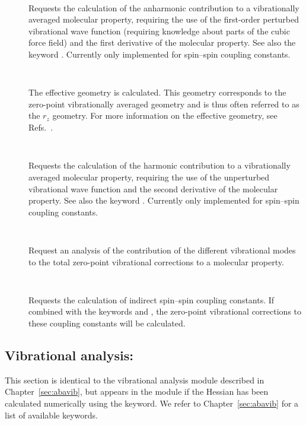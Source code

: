 \begin{description}

\item[]\verb| |\newline

Requests the calculation of the anharmonic contribution to a
vibrationally averaged molecular property, requiring the use of the
first-order perturbed vibrational wave function (requiring knowledge
about parts of the cubic force field) and the first derivative of the
molecular property. See also the keyword . Currently only
implemented for spin--spin coupling constants.

\item[]\verb| |\newline

The effective geometry is calculated. This geometry corresponds to the
zero-point vibrationally averaged geometry and is thus often referred
to as the $r_z$ geometry. For more information on the effective
geometry, see Refs.~\cite{poakrprtjcp112,krpoaprtjcp112}.

\item[]\verb| |\newline

Requests the calculation of the harmonic contribution to a
vibrationally averaged molecular property, requiring the use of the
unperturbed vibrational wave function and the second derivative of the
molecular property. See also the keyword . Currently only
implemented for spin--spin coupling constants.

\item[]\verb| |\newline

Request an analysis of the contribution of the different vibrational modes
to the total zero-point vibrational corrections to a molecular property.

\item[]\verb| |\newline

Requests the calculation of indirect spin--spin coupling constants.
If combined with the keywords  and , the
zero-point vibrational corrections to these coupling constants will be
calculated. 

\end{description}

\subsection{Vibrational analysis: }
\label{sec:nmddrv.vibana}

This section is identical to the vibrational analysis module described
in Chapter~\ref{sec:abavib}, but appears in the  module
if the Hessian has been calculated numerically using the 
keyword. We refer to Chapter~\ref{sec:abavib} for a list of available
keywords.

